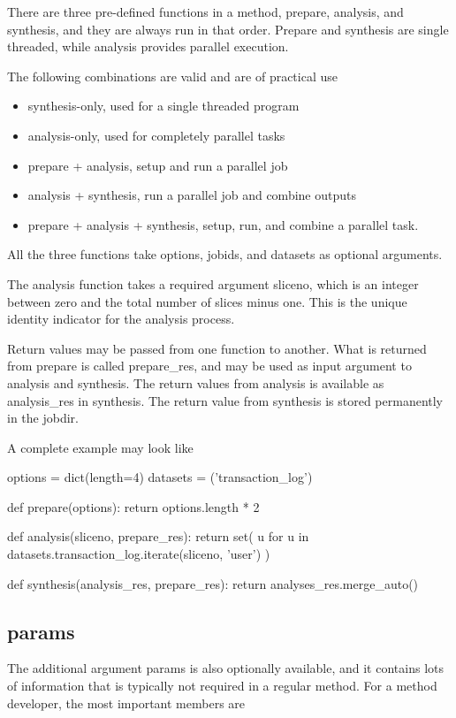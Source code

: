 There are three pre-defined functions in a method, prepare, analysis,
and synthesis, and they are always run in that order.  Prepare and
synthesis are single threaded, while analysis provides parallel
execution.

The following combinations are valid and are of practical use
\begin{itemize}
\item synthesis-only, used for a single threaded program
\item analysis-only, used for completely parallel tasks
\item prepare + analysis, setup and run a parallel job
\item analysis + synthesis, run a parallel job and combine outputs
\item prepare + analysis + synthesis, setup, run, and combine a
  parallel task.
\end{itemize}

All the three functions take options, jobids, and datasets as optional
arguments.

The analysis function takes a required argument sliceno, which is an
integer between zero and the total number of slices minus one.  This
is the unique identity indicator for the analysis process.

Return values may be passed from one function to another.  What is
returned from prepare is called prepare\_res, and may be used as input
argument to analysis and synthesis.  The return values from analysis
is available as analysis\_res in synthesis.  The return value from
synthesis is stored permanently in the jobdir.

A complete example may look like

\begin{python}
options = dict(length=4)
datasets = ('transaction_log')

def prepare(options):
  return options.length * 2

def analysis(sliceno, prepare_res):
  return set(
    u for u in datasets.transaction_log.iterate(sliceno, 'user')
  )

def synthesis(analysis_res, prepare_res):
   return analyses_res.merge_auto()
\end{python}


\subsection{params}
The additional argument params is also optionally available, and it
contains lots of information that is typically not required in a
regular method.  For a method developer, the most important members
are

